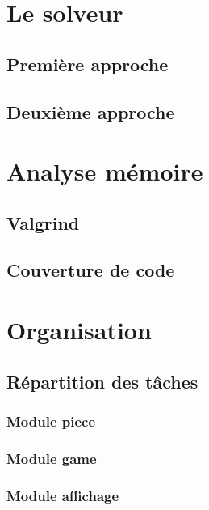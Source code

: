 \documentclass{article}
\begin{document}
\section{Le solveur}
\subsection{Première approche}
\subsection{Deuxième approche}


\section{Analyse mémoire}

\subsection{Valgrind}

\subsection{Couverture de code}

\section{Organisation}

\subsection{Répartition des tâches}
\subsubsection{Module piece}
\subsubsection{Module game}
\subsubsection{Module affichage}
\end{document}
